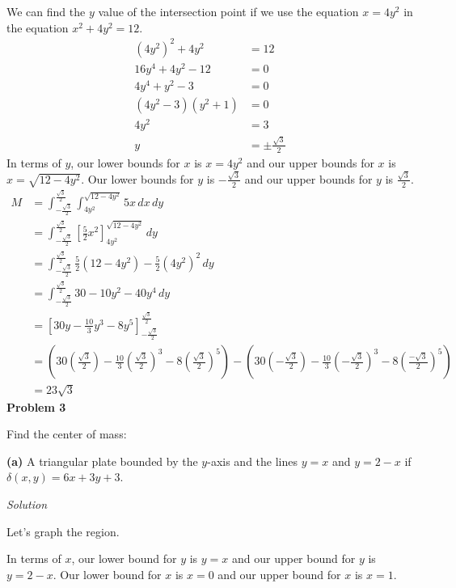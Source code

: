 \documentclass{article}
\newcommand{\lrp}[1]{\left( #1 \right)}
\newcommand{\lrb}[1]{\left[ #1 \right]}
\newcommand{\Solution}{\textit{Solution}}
\begin{document}
We can find the $y$ value of the intersection point if we use the equation $x=4y^2$ in the equation $x^2+4y^2=12$.
\begin{align*}
    (4y^2)^2+4y^2&=12\\
    16y^4+4y^2-12&=0\\
    4y^4+y^2-3&=0\\
    (4y^2 - 3)(y^2 +1)&=0\\
    4y^2&=3\tag{$y^2+1=0$ makes imaginary solutions}\\
    y&=\pm\frac{\sqrt{3}}{2}
\end{align*}
In terms of $y$, our lower bounds for $x$ is $x=4y^2$ and our upper bounds for $x$ is $x=\sqrt{12-4y^2}$. Our lower bounds for $y$ is $\displaystyle -\frac{\sqrt{3}}{2}$ and our upper bounds for $y$ is $\displaystyle \frac{\sqrt{3}}{2}$.
\begin{align*}
    M&=\int_{-\frac{\sqrt{3}}{2}}^{\frac{\sqrt{3}}{2}}\int_{4y^2}^{\sqrt{12-4y^2}}5x\,dx\,dy\\
    &=\int_{-\frac{\sqrt{3}}{2}}^{\frac{\sqrt{3}}{2}}\lrb{\frac{5}{2}x^2}_{4y^2}^{\sqrt{12-4y^2}}\,dy\\
    &=\int_{-\frac{\sqrt{3}}{2}}^{\frac{\sqrt{3}}{2}} \frac{5}{2}(12-4y^2)-\frac{5}{2}(4y^2)^2\,dy\\
    &=\int_{-\frac{\sqrt{3}}{2}}^{\frac{\sqrt{3}}{2}}30-10y^2-40y^4\,dy\\
    &=\lrb{30y-\frac{10}{3}y^3-8y^5}_{-\frac{\sqrt{3}}{2}}^{\frac{\sqrt{3}}{2}}\\
    &=\lrp{30\lrp{\frac{\sqrt{3}}{2}}-\frac{10}{3}\lrp{\frac{\sqrt{3}}{2}}^3-8\lrp{\frac{\sqrt{3}}{2}}^5}-\lrp{30\lrp{-\frac{\sqrt{3}}{2}}-\frac{10}{3}\lrp{-\frac{\sqrt{3}}{2}}^3-8\lrp{\frac{-\sqrt{3}}{2}}^5}\\
    &=\boxed{23\sqrt{3}}\tag{use your calculator :)}
\end{align*}
\textbf{Problem 3}

Find the center of mass:

\textbf{(a)} A triangular plate bounded by the $y$-axis and the lines $y = x$ and $y = 2 -x$ if
$\delta(x,y) = 6x + 3y + 3$.

\Solution

Let's graph the region.
\begin{center}
\end{center}
In terms of $x$, our lower bound for $y$ is $y=x$ and our upper bound for $y$ is $y=2-x$. Our lower bound for $x$ is $x=0$ and our upper bound for $x$ is $x=1$.
\end{document}

